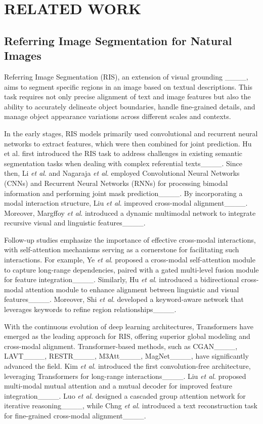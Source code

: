 \section{RELATED WORK}
\subsection{Referring Image Segmentation for Natural Images}
Referring Image Segmentation (RIS), an extension of visual grounding ____, aims to segment specific regions in an image based on textual descriptions. This task requires not only precise alignment of text and image features but also the ability to accurately delineate object boundaries, handle fine-grained details, and manage object appearance variations across different scales and contexts.

In the early stages, RIS models primarily used convolutional and recurrent neural networks to extract features, which were then combined for joint prediction. Hu et al. first introduced the RIS task to address challenges in existing semantic segmentation tasks when dealing with complex referential texts____. Since then, Li \textit{et al}. and Nagaraja \textit{et al}. employed Convolutional Neural Networks (CNNs) and Recurrent Neural Networks (RNNs) for processing bimodal information and performing joint mask prediction____. By incorporating a modal interaction structure, Liu \textit{et al}. improved cross-modal alignment____. Moreover, Margffoy \textit{et al}. introduced a dynamic multimodal network to integrate recursive visual and linguistic features____.

Follow-up studies emphasize the importance of effective cross-modal interactions, with self-attention mechanisms serving as a cornerstone for facilitating such interactions. For example, Ye \textit{et al}. proposed a cross-modal self-attention module to capture long-range dependencies, paired with a gated multi-level fusion module for feature integration____. Similarly, Hu \textit{et al}. introduced a bidirectional cross-modal attention module to enhance alignment between linguistic and visual features____. Moreover, Shi \textit{et al}. developed a keyword-aware network that leverages keywords to refine region relationships____.

With the continuous evolution of deep learning architectures, Transformers have emerged as the leading approach for RIS, offering superior global modeling and cross-modal alignment. Transformer-based methods, such as CGAN____, LAVT____, RESTR____, M3Att____, MagNet____, have significantly advanced the field. Kim \textit{et al}. introduced the first convolution-free architecture, leveraging Transformers for long-range interactions____. Liu \textit{et al}. proposed multi-modal mutual attention and a mutual decoder for improved feature integration____. Luo \textit{et al}. designed a cascaded group attention network for iterative reasoning____, while Chng \textit{et al}. introduced a text reconstruction task for fine-grained cross-modal alignment____.

